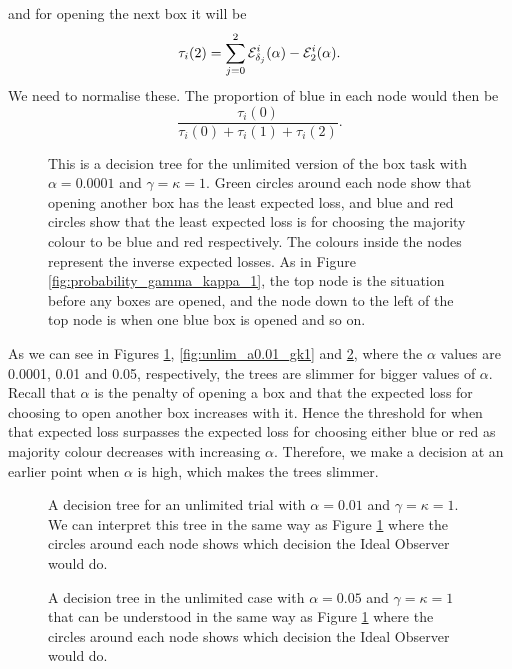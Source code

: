 and for opening the next box it will be
\begin{equation*}
    \tau_i(2) = \sum_{j=0}^2 \mathcal{E}_{\delta_j}^i(\alpha) - \mathcal{E}_2^i(\alpha).
\end{equation*}
We need to normalise these. The proportion of blue in each node would then be
\begin{equation*}
    \frac{\tau_i(0)}{\tau_i(0)+\tau_i(1)+\tau_i(2)}.
\end{equation*}
\begin{figure}
    \centering
    \scalebox{0.7}{}
    \caption[IO solution, unlimited. $\alpha=0.0001$, $\gamma=\kappa=1$]{This is a decision tree for the unlimited version of the box task with $\alpha = 0.0001$ and $\gamma=\kappa=1$. Green circles around each node show that opening another box has the least expected loss, and blue and red circles show that the least expected loss is for choosing the majority colour to be blue and red respectively. The colours inside the nodes represent the inverse expected losses. As in Figure \ref{fig:probability_gamma_kappa_1}, the top node is the situation before any boxes are opened, and the node down to the left of the top node is when one blue box is opened and so on.}
    \label{fig:unlim_a0.0001_gk1}
\end{figure}


As we can see in Figures \ref{fig:unlim_a0.0001_gk1}, \ref{fig:unlim_a0.01_gk1} and \ref{fig:unlim_a0.05_gk1}, where the $\alpha$ values are 0.0001, 0.01 and 0.05, respectively, the trees are slimmer for bigger values of $\alpha$. Recall that $\alpha$ is the penalty of opening a box and that the expected loss for choosing to open another box increases with it. Hence the threshold for when that expected loss surpasses the expected loss for choosing either blue or red as majority colour decreases with increasing $\alpha$. Therefore, we make a decision at an earlier point when $\alpha$ is high, which makes the trees slimmer.
\begin{figure}
    \centering
    \begin{minipage}{0.45\textwidth} 
        \centering
        \scalebox{0.5}{}
        \caption[IO solution, unlimited. $\alpha=0.01$,$\gamma=\kappa=1$]{A decision tree for an unlimited trial with $\alpha = 0.01$ and $\gamma=\kappa=1$.
        We can interpret this tree in the same way as Figure \ref{fig:unlim_a0.0001_gk1} where the circles around each node shows which decision the Ideal Observer would do.}
        \label{fig:unlim_a0.01_gk1}
    \end{minipage}\hfill
    \begin{minipage}{0.45\textwidth}
        \centering
        \scalebox{0.5}{}
        \caption[IO solution, unlimited. $\alpha=0.05$,$\gamma=\kappa=1$]{A decision tree in the unlimited case with $\alpha = 0.05$ and $\gamma=\kappa=1$ that can be understood in the same way as Figure \ref{fig:unlim_a0.0001_gk1} where the circles around each node shows which decision the Ideal Observer would do.}
        \label{fig:unlim_a0.05_gk1}
    \end{minipage}
\end{figure}



